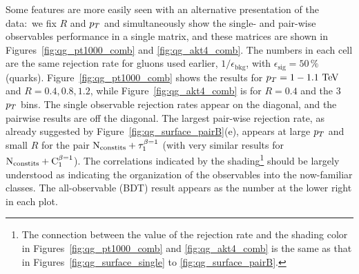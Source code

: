 Some features are more easily seen with an alternative presentation of the data:~we fix  $R$ and $p_T$ and simultaneously show the single- and pair-wise  observables performance in a single matrix, and these matrices are shown in Figures~\ref{fig:qg_pt1000_comb} and \ref{fig:qg_akt4_comb}.  
The numbers in each cell are the same rejection rate for gluons used earlier,
 $1/\epsilon_\text{bkg}$, with $\epsilon_\text{sig}= 50\,\% $ (quarks).  Figure~\ref{fig:qg_pt1000_comb} shows the results for $\pt=1-1.1 \TeV$ and
$R =0.4,0.8,1.2$, while  Figure~\ref{fig:qg_akt4_comb} is for $R = 0.4$ and the 3 $p_T$ bins.  The single observable rejection rates appear on the 
diagonal, and the pairwise results are off the diagonal.  The largest pair-wise rejection rate, as already suggested by Figure~\ref{fig:qg_surface_pairB}(e),
appears at large $p_T$ and small $R$ for the pair $\rm{N_ {constits}}+ \tau_1^{\beta=1}$ 
(with very similar results for $\rm{N_ {constits}}+ C_1^{\beta=1}$). 
The correlations indicated by the shading\footnote{The connection between the value of the rejection rate and the shading color in 
Figures~\ref{fig:qg_pt1000_comb} and \ref{fig:qg_akt4_comb} is the same as that in Figures~\ref{fig:qg_surface_single} to \ref{fig:qg_surface_pairB}.}   
should be largely understood as indicating the organization of the observables into the now-familiar
classes.  The all-observable (BDT) result appears as the number at the lower right in each plot.


